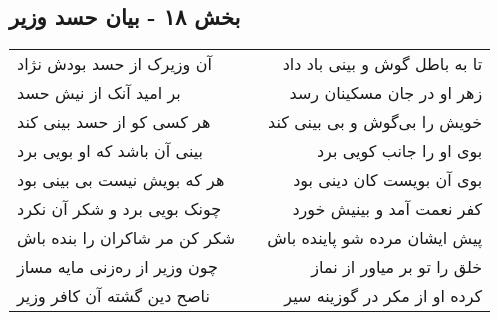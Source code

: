 \begin{center}
\section*{بخش ۱۸ - بیان حسد وزیر}
\label{sec:sh018}
\begin{longtable}{l p{0.5cm} r}
آن وزیرک از حسد بودش نژاد
&&
تا به باطل گوش و بینی باد داد
\\
بر امید آنک از نیش حسد
&&
زهر او در جان مسکینان رسد
\\
هر کسی کو از حسد بینی کند
&&
خویش را بی‌گوش و بی بینی کند
\\
بینی آن باشد که او بویی برد
&&
بوی او را جانب کویی برد
\\
هر که بویش نیست بی بینی بود
&&
بوی آن بویست کان دینی بود
\\
چونک بویی برد و شکر آن نکرد
&&
کفر نعمت آمد و بینیش خورد
\\
شکر کن مر شاکران را بنده باش
&&
پیش ایشان مرده شو پاینده باش
\\
چون وزیر از ره‌زنی مایه مساز
&&
خلق را تو بر میاور از نماز
\\
ناصح دین گشته آن کافر وزیر
&&
کرده او از مکر در گوزینه سیر
\\
\end{longtable}
\end{center}
